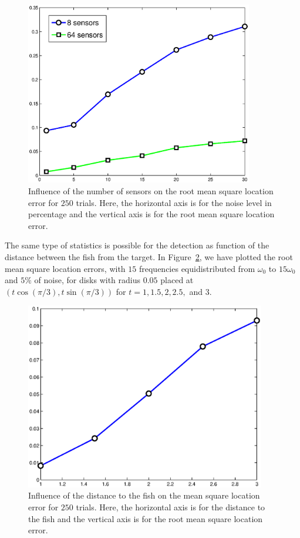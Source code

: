 \documentclass[final]{siamltex}
\numberwithin{equation}{section}
\numberwithin{figure}{section}
\numberwithin{table}{section}
\begin{document}
\begin{figure}
\centering\includegraphics[height=8cm]{stats-sensors-noise.eps}\caption{\label{fig:stats-sensors-noise}Influence
of the number of sensors on the root mean square location error
for $250$ trials. Here, the horizontal axis is for the noise level
in percentage and the vertical axis is for the root mean square
location error.}
\end{figure}


The same type of statistics is possible for the detection as
function of the distance between the fish from the target. In
Figure~\ref{fig:distance-noise}, we have plotted the root mean
square location errors, with $15$ frequencies equidistributed from
$\omega_0$ to $15 \omega_0$  and $5\%$ of noise, for disks with
radius $0.05$ placed at $(t\cos(\pi/3),t\sin(\pi/3))$ for $t=1,
1.5, 2, 2.5,$ and $3$.

\begin{figure}


\centering\includegraphics[width=10.5cm]{distance.eps}\caption{\label{fig:distance-noise}Influence
of the distance to the fish on the mean square location error for
$250$ trials. Here, the horizontal axis is for the distance to the
fish and the vertical axis is for the root mean square location
error.}


\end{figure}
\end{document}
